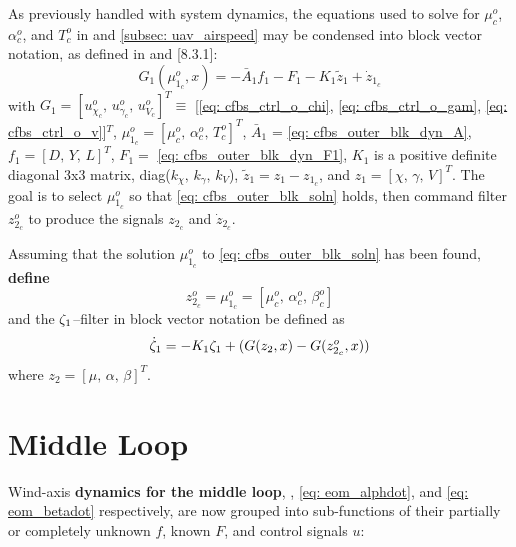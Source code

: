 \documentclass[12pt]{ucthesis}
\begin{document}
As previously handled with system dynamics, the equations used to solve for $\mu^o_c$, $\alpha^o_c$, and $T^o_c$ in  and \ref{subsec: uav_airspeed} may be condensed into block vector notation, as defined in \citet{Farrell2005} and \citet{Farrell2006}[8.3.1]:%
	\begin{equation} \label{eq: cfbs_outer_blk_soln}%
		G_1(\mu^o_{1_c},x) = -\bar{A}_1 f_1 -F_1 -K_1 \tilde{z}_1 + \dot{z}_{1_c}
	\end{equation}
with $G_1 = [u^o_{\chi_c},\,u^o_{\gamma_c},\,u^o_{V_c}]^T \equiv$ [\ref{eq: cfbs_ctrl_o_chi}, \ref{eq: cfbs_ctrl_o_gam}, \ref{eq: cfbs_ctrl_o_v}]$^T$, $\mu^o_{1_c} = [\mu^o_c,\, \alpha^o_c,\, T^o_c]^T$, $\bar{A}_1$ = \autoref{eq: cfbs_outer_blk_dyn_A}, $f_1 = [D,\,Y,\,L]^T$, $F_1 =$ \autoref{eq: cfbs_outer_blk_dyn_F1}, $K_1$ is a positive definite diagonal 3x3 matrix, diag($k_\chi,\,k_\gamma,\,k_V$), $\tilde{z}_1 = z_1 - z_{1_c}$, and $z_1 = [\chi,\,\gamma,\,V]^T$. The goal is to select $\mu^o_{1_c}$ so that \autoref{eq: cfbs_outer_blk_soln} holds, then command filter $z^o_{2_c}$ to produce the signals $z_{2_c}$ and $\dot{z}_{2_c}$.
 
Assuming that the solution $\mu^o_{1_c}$ to \autoref{eq: cfbs_outer_blk_soln} has been found, \textbf{define}
	\begin{equation} \label{eq: cfbs_outer_defn}
		z^o_{2_c} = \mu^o_{1_c} = [\mu^o_c,\, \alpha^o_c,\, \beta^o_c]
	\end{equation}
and the $\zeta_1$--filter in block vector notation be defined as
	\begin{equation} \label{eq: cfbs_outer_blk_filt}
		\dot{\zeta}_1 = -K_1 \zeta_1 + (G(z_2,x) - G(z^o_{2_c},x))
	\end{equation} %
where $z_2 = [\mu,\, \alpha,\,\beta]^T$.

\section{Middle Loop}
\label{sec: uav_middle_loop}
%
Wind-axis \textbf{dynamics for the middle loop}, , \ref{eq: eom_alphdot}, and \ref{eq: eom_betadot} respectively, are now grouped into sub-functions of their partially or completely unknown $f$, known $F$, and control signals $u$:
\end{document}
